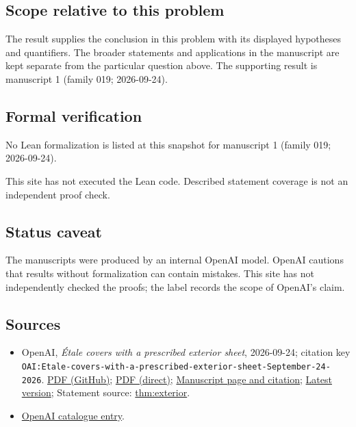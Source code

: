 \documentclass[11pt]{article}
\begin{document}
\subsection{Scope relative to this problem}
The result supplies the conclusion in this problem with its displayed hypotheses and quantifiers. The broader statements and applications in the manuscript are kept separate from the particular question above. The supporting result is manuscript 1 (family 019; 2026-09-24).

\subsection{Formal verification}
No Lean formalization is listed at this snapshot for manuscript 1 (family 019; 2026-09-24).

This site has not executed the Lean code. Described statement coverage is not an independent proof check.

\subsection{Status caveat}
The manuscripts were produced by an internal OpenAI model. OpenAI cautions that results without formalization can contain mistakes. This site has not independently checked the proofs; the label records the scope of OpenAI's claim.

\subsection{Sources}
\begin{itemize}
\item OpenAI, \emph{Étale covers with a prescribed exterior sheet}, 2026-09-24; citation key \texttt{OAI:Etale-covers-with-a-prescribed-exterior-sheet-September-24-2026}. \href{https://github.com/openai/math/blob/adc7f1241b42e322a6451854ab7e4b4c146bf78a/preprints/Etale-covers-with-a-prescribed-exterior-sheet-September-24-2026/main.pdf}{PDF (GitHub)}; \href{https://github.com/openai/math/raw/adc7f1241b42e322a6451854ab7e4b4c146bf78a/preprints/Etale-covers-with-a-prescribed-exterior-sheet-September-24-2026/main.pdf}{PDF (direct)}; \href{https://github.com/openai/math/blob/adc7f1241b42e322a6451854ab7e4b4c146bf78a/preprints/Etale-covers-with-a-prescribed-exterior-sheet-September-24-2026/README.md}{Manuscript page and citation}; \href{https://github.com/openai/math/blob/main/preprints/Etale-covers-with-a-prescribed-exterior-sheet-September-24-2026/main.pdf}{Latest version}; Statement source: \href{https://github.com/openai/math/blob/adc7f1241b42e322a6451854ab7e4b4c146bf78a/preprints/Etale-covers-with-a-prescribed-exterior-sheet-September-24-2026/build/sections/01-statement.tex\#L29}{thm:exterior}.
\item \href{https://github.com/openai/math/blob/adc7f1241b42e322a6451854ab7e4b4c146bf78a/CONTENTS.md}{OpenAI catalogue entry}.
\end{itemize}
\end{document}
